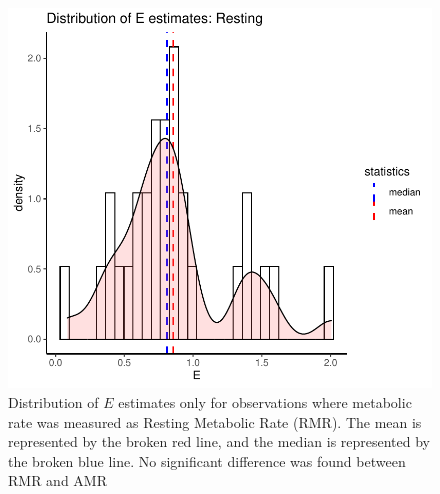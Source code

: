 \documentclass{article}
\begin{document}
\begin{figure}[h]
    \centering
    \includegraphics[width=6in]{resting.pdf}
    \caption{\label{fig:S2} Distribution of \emph{$E$} estimates only for observations where metabolic rate was measured as Resting Metabolic Rate (RMR). The mean is represented by the broken red line, and the median is represented by the broken blue line. No significant difference was found between RMR and AMR}
\end{figure}
\clearpage
\end{document}
